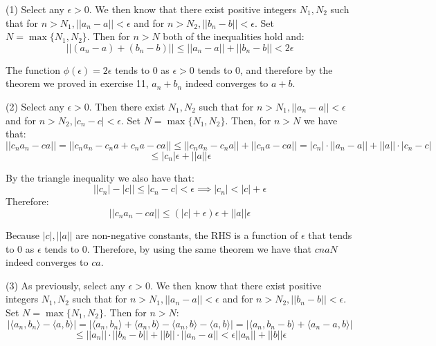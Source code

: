 \begin{solution}

    (1) Select any $\epsilon > 0$. We then know that there exist positive integers $N_1, N_2$ such that for $n > N_1, \lvert \lvert a_n - a \rvert \rvert < \epsilon$ and for $n > N_2, \lvert \lvert b_n - b \rvert \rvert < \epsilon$. Set $N = \max\{N_1, N_2\}$. Then for $n > N$ both of the inequalities hold and:
    $$\lvert \lvert (a_n - a) + (b_n - b) \rvert \rvert \leq \lvert \lvert a_n - a \rvert \rvert + \lvert \lvert b_n - b \rvert \rvert < 2\epsilon$$

    The function $\phi(\epsilon) = 2\epsilon$ tends to 0 as $\epsilon > 0$ tends to 0, and therefore by the theorem we proved in exercise 11, $a_n + b_n$ indeed converges to $a+b$.

    (2) Select any $\epsilon > 0$. Then there exist $N_1, N_2$ such that for $n > N_1, \lvert \lvert a_n - a \rvert \rvert < \epsilon$ and for $n > N_2, \lvert c_n - c \rvert < \epsilon$. Set $N = \max\{N_1, N_2\}$. Then, for $n > N$ we have that:
    $$\lvert \lvert c_na_n - ca \rvert \rvert = \lvert \lvert c_na_n - c_na + c_na - ca \rvert \rvert \leq \lvert \lvert c_na_n - c_na \rvert \rvert + \lvert \lvert c_na - ca \rvert \rvert = \lvert c_n \rvert \cdot \lvert \lvert a_n - a \rvert \rvert + \lvert \lvert a \rvert \rvert \cdot \lvert c_n - c \rvert$$
    $$\leq \lvert c_n \rvert \epsilon + \lvert \lvert a \rvert \rvert \epsilon$$

    By the triangle inequality we also have that:
    $$\bigl\lvert \lvert c_n \rvert - \lvert c \rvert \bigr\rvert \leq \lvert c_n - c \rvert < \epsilon \implies \lvert c_n \rvert < \lvert c \rvert + \epsilon$$
    Therefore:
    $$\lvert \lvert c_na_n - ca \rvert \rvert \leq (\lvert c \rvert + \epsilon)\epsilon + \lvert \lvert a \rvert \rvert \epsilon$$

    Because $\lvert c \rvert, \lvert \lvert a \rvert \rvert$ are non-negative constants, the RHS is a function of $\epsilon$ that tends to 0 as $\epsilon$ tends to 0. Therefore, by using the same theorem we have that $cnaN$ indeed converges to $ca$.

    (3) As previously, select any $\epsilon > 0$. We then know that there exist positive integers $N_1, N_2$ such that for $n > N_1, \lvert \lvert a_n - a \rvert \rvert < \epsilon$ and for $n > N_2, \lvert \lvert b_n - b \rvert \rvert < \epsilon$. Set $N = \max\{N_1, N_2\}$. Then for $n > N$:
    $$\lvert \langle a_n, b_n \rangle - \langle a, b \rangle \rvert = \lvert \langle a_n, b_n \rangle + \langle a_n, b \rangle - \langle a_n, b \rangle - \langle a, b \rangle \rvert = \lvert \langle a_n, b_n - b \rangle + \langle a_n -a, b \rangle \rvert$$
    $$\leq \lvert \lvert a_n \rvert \rvert \cdot \lvert \lvert b_n - b \rvert \rvert + \lvert \lvert b \rvert \rvert \cdot \lvert \lvert a_n - a \rvert \rvert < \epsilon \lvert \lvert a_n \rvert \rvert + \lvert \lvert b \rvert \rvert \epsilon$$


\end{solution}
